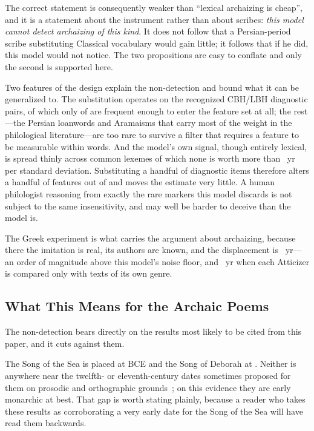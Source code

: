 \documentclass[10pt,letterpaper]{article}
\newcommand{\cbh}{CBH}
\newcommand{\lbh}{LBH}
\begin{document}
The correct statement is consequently weaker than ``lexical archaizing is
cheap'', and it is a statement about the instrument rather than about scribes:
\emph{this model cannot detect archaizing of this kind}.  It does not follow
that a Persian-period scribe substituting Classical vocabulary would gain
little; it follows that if he did, this model would not notice.  The two
propositions are easy to conflate and only the second is supported here.

Two features of the design explain the non-detection and bound what it can be
generalized to.  The substitution operates on the recognized \cbh{}/\lbh{}
diagnostic pairs, of which only \LXdiagPresent{} of \LXdiagTotal{} are frequent
enough to enter the feature set at all; the rest---the Persian loanwords and
Aramaisms that carry most of the weight in the philological literature---are too
rare to survive a filter that requires a feature to be measurable within
\HBtarget{} words.  And the model's own signal, though entirely lexical, is
spread thinly across \LXnlex{} common lexemes of which none is worth more than
\sensTopLever~yr per standard deviation.  Substituting a handful of diagnostic
items therefore alters a handful of features out of \LXnlex{} and moves the
estimate very little.  A human philologist reasoning from exactly the rare
markers this model discards is not subject to the same insensitivity, and may
well be harder to deceive than the model is.

The Greek experiment is what carries the argument about archaizing, because
there the imitation is real, its authors are known, and the displacement is
\GKattshiftAbs~yr---an order of magnitude above this model's noise floor, and
\GKwithinAbs~yr when each Atticizer is compared only with texts of its own
genre.

\subsection*{What This Means for the Archaic Poems}

The non-detection bears directly on the results most likely to be cited from
this paper, and it cuts against them.

The Song of the Sea is placed at \poemSea{} BCE and the Song of Deborah at
\poemDeb.  Neither is anywhere near the twelfth- or eleventh-century dates
sometimes proposed for them on prosodic and orthographic
grounds~\cite{Albright1968,Cross1975}; on this evidence they are early
monarchic at best.  That gap is worth stating plainly, because a reader who
takes these results as corroborating a very early date for the Song of the Sea
will have read them backwards.
\end{document}

